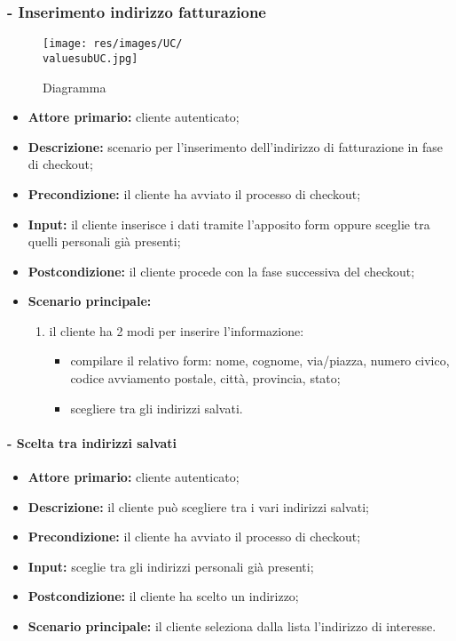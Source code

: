 \stepsubUserCase
\subsubsection{ - Inserimento indirizzo fatturazione}
\begin{figure}[H]
    \centering
    \texttt{[image: res/images/UC/\\valuesubUC.jpg]}
    \caption{Diagramma }
\end{figure}
\begin{itemize}
    \item \textbf{Attore primario:} cliente autenticato;
    \item \textbf{Descrizione:} scenario per l'inserimento dell'indirizzo di fatturazione in fase di checkout;
    \item \textbf{Precondizione:} il cliente ha avviato il processo di checkout;
    \item \textbf{Input:} il cliente inserisce i dati tramite l'apposito form oppure sceglie tra quelli personali già presenti;
    \item \textbf{Postcondizione:} il cliente procede con la fase successiva del checkout;
    \item \textbf{Scenario principale:}
          \begin{enumerate}
              \item il cliente ha 2 modi per inserire l'informazione:
                    \begin{itemize}
                        \item compilare il relativo form: nome, cognome, via/piazza, numero civico, codice avviamento postale, città, provincia, stato;
                        \item scegliere tra gli indirizzi salvati.
                    \end{itemize}
          \end{enumerate}
\end{itemize}

\stepsubsubUserCase
\paragraph{ - Scelta tra indirizzi salvati}
\begin{itemize}
    \item \textbf{Attore primario:} cliente autenticato;
    \item \textbf{Descrizione:} il cliente può scegliere tra i vari indirizzi salvati;
    \item \textbf{Precondizione:} il cliente ha avviato il processo di checkout;
    \item \textbf{Input:} sceglie tra gli indirizzi personali già presenti;
    \item \textbf{Postcondizione:} il cliente ha scelto un indirizzo;
    \item \textbf{Scenario principale:}  il cliente seleziona dalla lista l'indirizzo di interesse.
\end{itemize}


